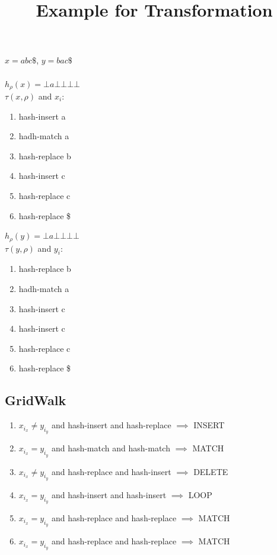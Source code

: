 \documentclass{article}
\title{Example for Transformation}
\author{}
\date{}
\begin{document}
\maketitle

$x=abc\$$, $y=bac\$$ \noindent\\
\\
$h_\rho(x)=\bot a\bot\bot\bot\bot$\\
$\tau(x,\rho)$ and $x_i$:
\begin{enumerate}
    \item hash-insert a
    \item hadh-match a
    \item hash-replace b
    \item hash-insert c
    \item hash-replace c
    \item hash-replace \$
\end{enumerate}

$h_\rho(y)=\bot a\bot\bot\bot\bot$\\
$\tau(y,\rho)$ and $y_i$:
\begin{enumerate}
    \item hash-replace b
    \item hadh-match a
    \item hash-insert c
    \item hash-insert c
    \item hash-replace c
    \item hash-replace \$
\end{enumerate}

\subsection*{GridWalk}
\begin{enumerate}
    \item $x_{i_x}\neq y_{i_y}$ and hash-insert and hash-replace $\implies$ INSERT
    \item $x_{i_x}= y_{i_y}$ and hash-match and hash-match $\implies$ MATCH
    \item $x_{i_x}\neq y_{i_y}$ and hash-replace and hash-insert $\implies$ DELETE
    \item $x_{i_x}= y_{i_y}$ and hash-insert and hash-insert $\implies$ LOOP
    \item $x_{i_x}= y_{i_y}$ and hash-replace and hash-replace $\implies$ MATCH
    \item $x_{i_x}= y_{i_y}$ and hash-replace and hash-replace $\implies$ MATCH
\end{enumerate}
\end{document}
